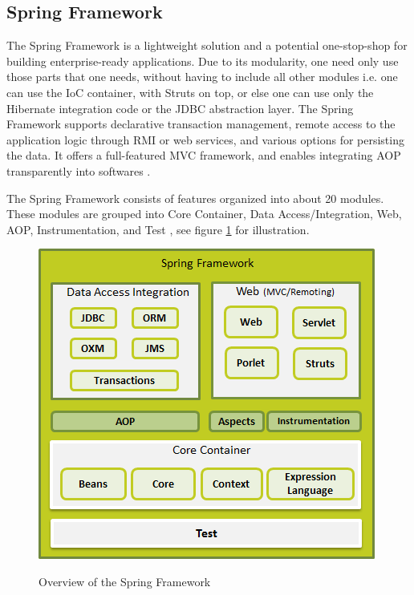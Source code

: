 \subsection{Spring Framework\label{sec:back_sp_fr}}
The Spring Framework is a lightweight solution and a potential one-stop-shop for building enterprise-ready applications. Due to its modularity, one need only use those parts that one needs, without having to include all other modules i.e. one can use the IoC container, with Struts on top, or else one can use only the Hibernate integration code or the \ac{JDBC} abstraction layer. The Spring Framework supports declarative transaction management, remote access to the application logic through \ac{RMI} or web services, and various options for persisting the data. It offers a full-featured \ac{MVC} framework, and enables integrating \ac{AOP} transparently into  softwares \cite{spring-framework-reference}.


The Spring Framework consists of features organized into about 20 modules. These modules are grouped into Core Container, Data Access/Integration, Web, \ac{AOP}, Instrumentation, and Test \cite{spring-framework-reference}, see figure \ref{fig:spring_arch} for illustration.


\begin{figure}[htb]
  \centering
  \includegraphics[scale=0.6]{spring_architecture.png}\\
  \caption{Overview of the Spring Framework}
  \label{fig:spring_arch}
  \protect\cite{spring-framework-reference}
\end{figure}




